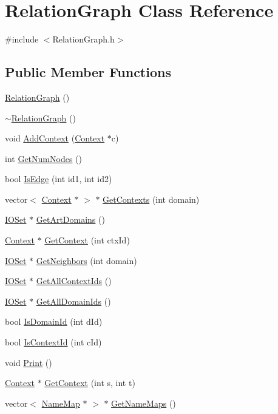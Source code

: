 \hypertarget{class_relation_graph}{
\section{RelationGraph Class Reference}
\label{class_relation_graph}
}


{\ttfamily \#include $<$RelationGraph.h$>$}

\subsection*{Public Member Functions}
\begin{DoxyCompactItemize}
\item 
\hyperlink{class_relation_graph_a6bac261190e85c0fa8cce617184ea6a0}{RelationGraph} ()
\item 
\hyperlink{class_relation_graph_a801766615e87cb42f511cb068dd9d482}{$\sim$RelationGraph} ()
\item 
void \hyperlink{class_relation_graph_a5c1bd71649ec9c19f28b3fe0abda9540}{AddContext} (\hyperlink{class_context}{Context} $\ast$c)
\item 
int \hyperlink{class_relation_graph_adeb2d25e6c30b397daec5179473ba122}{GetNumNodes} ()
\item 
bool \hyperlink{class_relation_graph_a647ab3afb7708f13e5ec480462dedb39}{IsEdge} (int id1, int id2)
\item 
vector$<$ \hyperlink{class_context}{Context} $\ast$ $>$ $\ast$ \hyperlink{class_relation_graph_acd16774976073a33da14d8461ba4165d}{GetContexts} (int domain)
\item 
\hyperlink{class_i_o_set}{IOSet} $\ast$ \hyperlink{class_relation_graph_adf3c6bb0287acf5e5569b88a3d3a9326}{GetArtDomains} ()
\item 
\hyperlink{class_context}{Context} $\ast$ \hyperlink{class_relation_graph_afb733508ef74b8b09adda722af855f32}{GetContext} (int ctxId)
\item 
\hyperlink{class_i_o_set}{IOSet} $\ast$ \hyperlink{class_relation_graph_a82dafd34929842c2ddf93d42551db4f1}{GetNeighbors} (int domain)
\item 
\hyperlink{class_i_o_set}{IOSet} $\ast$ \hyperlink{class_relation_graph_a3ce2cfa6d1becccfdef2f7fc851026d5}{GetAllContextIds} ()
\item 
\hyperlink{class_i_o_set}{IOSet} $\ast$ \hyperlink{class_relation_graph_ac4d09659ad3e4a4856abe9b15edc0105}{GetAllDomainIds} ()
\item 
bool \hyperlink{class_relation_graph_ab7cc26b947be79d26f078da0dc1936eb}{IsDomainId} (int dId)
\item 
bool \hyperlink{class_relation_graph_adbbbff1b919cf1c4f86620a0bd925cc4}{IsContextId} (int cId)
\item 
void \hyperlink{class_relation_graph_a1a3279bf6ed14795cf41124f9cc730ac}{Print} ()
\item 
\hyperlink{class_context}{Context} $\ast$ \hyperlink{class_relation_graph_aed7ec9b885e3f3cba079232e0a59b027}{GetContext} (int s, int t)
\item 
vector$<$ \hyperlink{class_name_map}{NameMap} $\ast$ $>$ $\ast$ \hyperlink{class_relation_graph_a79d93b2f1cb9226aa4a3fcbbe423588b}{GetNameMaps} ()
\end{DoxyCompactItemize}
